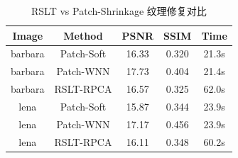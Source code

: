 \begin{table}[htbp]
\centering
\caption{RSLT vs Patch-Shrinkage 纹理修复对比}
\label{tab:chapter5_rslt_compare}
\small
\begin{tabular}{|c|c|c|c|c|}
\hline
Image & Method & PSNR & SSIM & Time \\
\hline
barbara & Patch-Soft & 16.33 & 0.320 & 21.3s \\
barbara & Patch-WNN & 17.73 & 0.404 & 21.4s \\
barbara & RSLT-RPCA & 16.57 & 0.325 & 62.0s \\
lena & Patch-Soft & 15.87 & 0.344 & 23.9s \\
lena & Patch-WNN & 17.17 & 0.456 & 23.9s \\
lena & RSLT-RPCA & 16.11 & 0.348 & 60.2s \\
\hline
\end{tabular}
\end{table}
